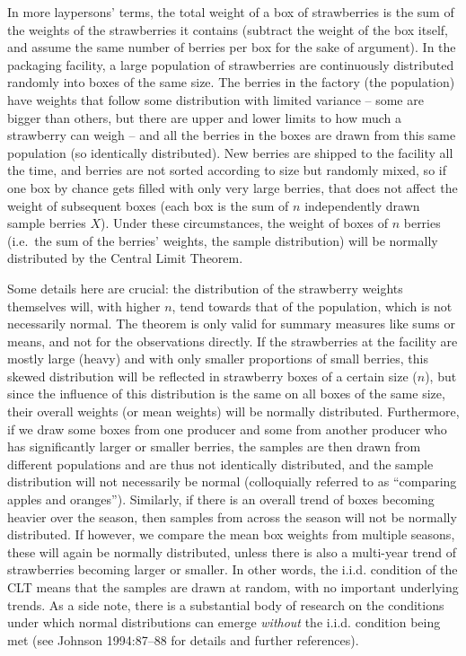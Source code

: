 \documentclass[
  12pt,
]{book}
\begin{document}
In more laypersons' terms, the total weight of a box of strawberries is the sum of the weights of the strawberries it contains (subtract the weight of the box itself, and assume the same number of berries per box for the sake of argument). In the packaging facility, a large population of strawberries are continuously distributed randomly into boxes of the same size. The berries in the factory (the population) have weights that follow some distribution with limited variance -- some are bigger than others, but there are upper and lower limits to how much a strawberry can weigh -- and all the berries in the boxes are drawn from this same population (so identically distributed). New berries are shipped to the facility all the time, and berries are not sorted according to size but randomly mixed, so if one box by chance gets filled with only very large berries, that does not affect the weight of subsequent boxes (each box is the sum of \(n\) independently drawn sample berries \(X\)). Under these circumstances, the weight of boxes of \(n\) berries (i.e.~the sum of the berries' weights, the sample distribution) will be normally distributed by the Central Limit Theorem.

Some details here are crucial: the distribution of the strawberry weights themselves will, with higher \(n\), tend towards that of the population, which is not necessarily normal. The theorem is only valid for summary measures like sums or means, and not for the observations directly. If the strawberries at the facility are mostly large (heavy) and with only smaller proportions of small berries, this skewed distribution will be reflected in strawberry boxes of a certain size (\(n\)), but since the influence of this distribution is the same on all boxes of the same size, their overall weights (or mean weights) will be normally distributed. Furthermore, if we draw some boxes from one producer and some from another producer who has significantly larger or smaller berries, the samples are then drawn from different populations and are thus not identically distributed, and the sample distribution will not necessarily be normal (colloquially referred to as ``comparing apples and oranges''). Similarly, if there is an overall trend of boxes becoming heavier over the season, then samples from across the season will not be normally distributed. If however, we compare the mean box weights from multiple seasons, these will again be normally distributed, unless there is also a multi-year trend of strawberries becoming larger or smaller. In other words, the i.i.d. condition of the CLT means that the samples are drawn at random, with no important underlying trends. As a side note, there is a substantial body of research on the conditions under which normal distributions can emerge \emph{without} the i.i.d. condition being met (see Johnson 1994:87--88 for details and further references).
\end{document}
